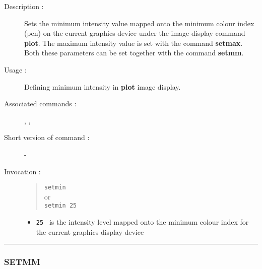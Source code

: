 \begin{description}

\item[Description :] Sets the minimum intensity value mapped onto the
minimum colour index (pen) on the current graphics device under the
image display command {\bf plot}.  The maximum intensity value is set with
the command {\bf setmax}.  Both these parameters can be set together with the
command {\bf setmm}.

\item[Usage :] Defining minimum intensity in {\bf plot} image display.

\item[Associated commands :] {\tt {}}, 
{\tt {}}, {\tt {}}

\item[Short version of command :] -
\item[Invocation :]

\begin{quote}{\tt  setmin }\\
or \\
{\tt setmin 25 }
\end{quote}

\begin{itemize}

\item {\tt 25 } is the intensity level mapped onto the minimum colour
 index for the current graphics display device
\end{itemize}

\end{description}

\hrule 
\subsubsection*{\label{SETMM}SETMM}

